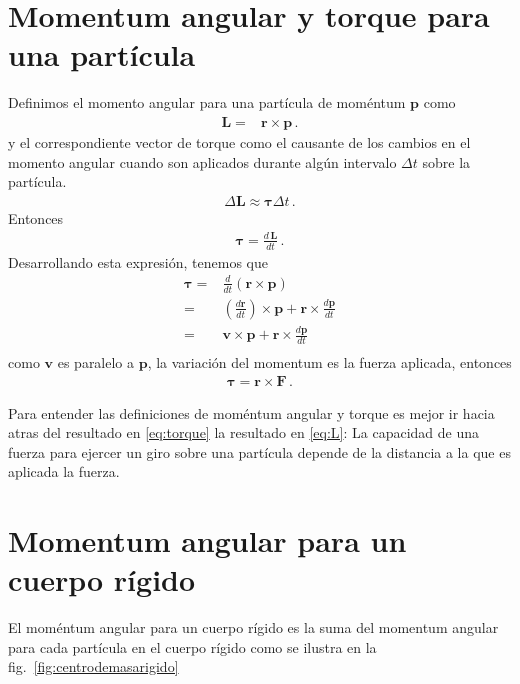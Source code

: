 \section{Momentum angular y torque para una partícula}
Definimos el momento angular para una partícula de moméntum $\mathbf{p}$ como
\begin{align}
  \label{eq:L}
  \mathbf{L}=&\mathbf{r}\times\mathbf{p}\,.
\end{align}
y el correspondiente vector de torque como el causante de los cambios
en el momento angular cuando son aplicados durante algún intervalo
$\Delta t$ sobre la partícula.
\begin{align}
  \Delta \mathbf{L}\approx \boldsymbol{\tau}\Delta t\,.
\end{align}
Entonces
\begin{align}
  \boldsymbol{\tau}=\frac{d\,\mathbf{L}}{dt}\,.
\end{align}
Desarrollando esta expresión, tenemos que
\begin{align}
  \boldsymbol{\tau}=&\frac{d}{dt}\left(\mathbf{r}\times\mathbf{p}\right)\nonumber\\
=&\left(\frac{d\mathbf{r}}{dt}\right)\times\mathbf{p}+
\mathbf{r}\times\frac{d\mathbf{p}}{dt}\nonumber\\
=&\mathbf{v}\times\mathbf{p}+
\mathbf{r}\times\frac{d\mathbf{p}}{dt}\nonumber\\
\end{align}
como $\mathbf{v}$ es paralelo a $\mathbf{p}$, la variación del
momentum es la fuerza aplicada, entonces
\begin{align}
  \label{eq:torque}
  \boldsymbol{\tau}=\mathbf{r}\times\mathbf{F}\,.
\end{align}

Para entender las definiciones de moméntum angular y torque es mejor
ir hacia atras del resultado en \eqref{eq:torque} la resultado en
\eqref{eq:L}: La capacidad de una fuerza para ejercer un giro sobre
una partícula depende de la distancia a la que es aplicada la fuerza.

\section{Momentum angular para un cuerpo rígido}


El moméntum angular para un cuerpo rígido es la suma del momentum
angular para cada partícula en el cuerpo rígido como se ilustra en la
fig.~\ref{fig:centrodemasarigido}

